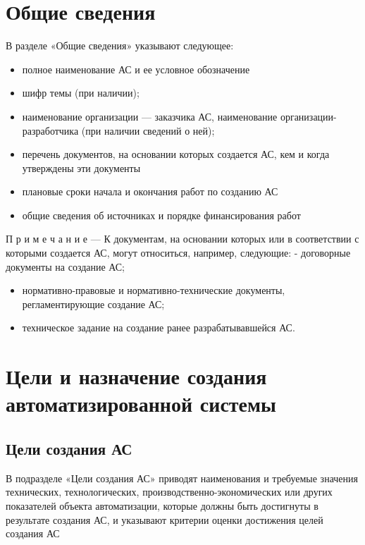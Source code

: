 {{{{\begin{flushright}
\begin{minipage}[t]{0.4\textwidth}
        \vspace{3mm}
        \makebox[6cm][r]{<<\rule{7mm}{0.4pt}>>\hrulefill~\the\year}
      \end{minipage}
    \end{flushright}
  }
}
\newpage
}
\section{Общие сведения}
В разделе «Общие сведения» указывают следующее:
\begin{itemize}
    \item полное наименование АС и ее условное обозначение
    \item шифр темы (при наличии);
    \item наименование организации — заказчика АС, наименование организации-разработчика (при наличии сведений о ней);
    \item перечень документов, на основании которых создается АС, кем и когда утверждены эти документы
    \item плановые сроки начала и окончания работ по созданию АС
    \item общие сведения об источниках и порядке финансирования работ
\end{itemize}

П р и м е ч а н и е — К документам, на основании которых или в соответствии с которыми создается АС, могут относиться, например, следующие:
- договорные документы на создание АС;
\begin{itemize}
  \item нормативно-правовые и нормативно-технические документы, регламентирующие создание АС;
  \item техническое задание на создание ранее разрабатывавшейся АС.
\end{itemize}
\section{Цели и назначение создания автоматизированной системы}

\subsection{Цели создания АС}
В подразделе «Цели создания АС» приводят наименования и требуемые значения технических, технологических, производственно-экономических или других показателей объекта автоматизации, которые должны быть достигнуты в результате создания АС, и указывают критерии оценки достижения целей создания АС

}
